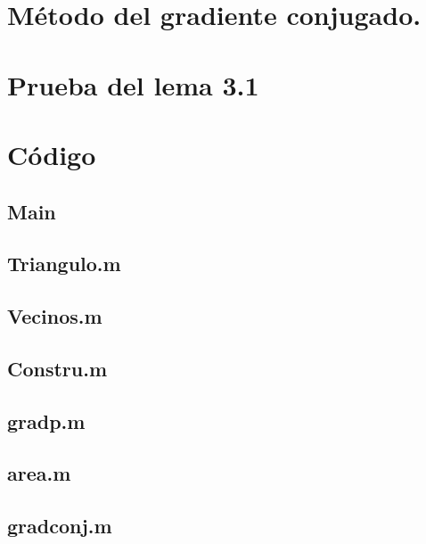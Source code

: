 \documentclass[12pt,spanish,oneside]{book}
\theoremstyle{plain}
\numberwithin{equation}{chapter}
\theoremstyle{definition}
\theoremstyle{remark}
\begin{document}
\chapter{Método del gradiente conjugado.}\label{AN1}

\chapter{Prueba del lema 3.1 }\label{AN2}
\chapter{Código}
\section{Main}

\section{Triangulo.m}

\section{Vecinos.m}

\section{Constru.m}

\section{gradp.m}
\section{area.m}

\section{gradconj.m}

\backmatter


\end{document}
